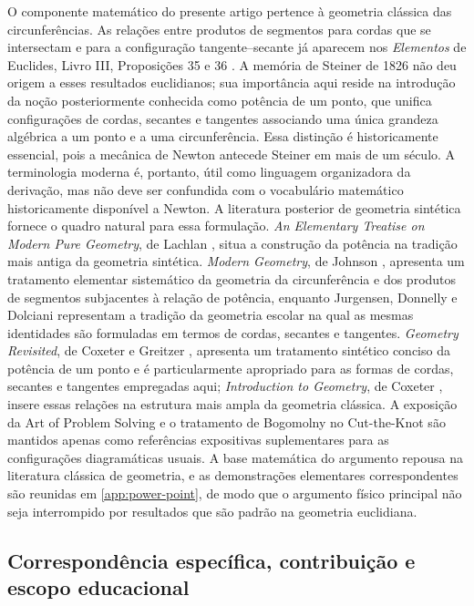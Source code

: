 \documentclass[12pt,a4paper]{article}
\numberwithin{equation}{section}
\theoremstyle{remark}
\begin{document}
O componente matemático do presente artigo pertence à geometria clássica das circunferências. As relações entre produtos de segmentos para cordas que se intersectam e para a configuração tangente--secante já aparecem nos \textit{Elementos} de Euclides, Livro III, Proposições 35 e 36 \cite{euclid1956elements}. A memória de Steiner de 1826 \cite{steiner1826einige} não deu origem a esses resultados euclidianos; sua importância aqui reside na introdução da noção posteriormente conhecida como potência de um ponto, que unifica configurações de cordas, secantes e tangentes associando uma única grandeza algébrica a um ponto e a uma circunferência. Essa distinção é historicamente essencial, pois a mecânica de Newton antecede Steiner em mais de um século. A terminologia moderna é, portanto, útil como linguagem organizadora da derivação, mas não deve ser confundida com o vocabulário matemático historicamente disponível a Newton. A literatura posterior de geometria sintética fornece o quadro natural para essa formulação. \textit{An Elementary Treatise on Modern Pure Geometry}, de Lachlan \cite{lachlan1893elementary}, situa a construção da potência na tradição mais antiga da geometria sintética. \textit{Modern Geometry}, de Johnson \cite{johnson1929modern}, apresenta um tratamento elementar sistemático da geometria da circunferência e dos produtos de segmentos subjacentes à relação de potência, enquanto Jurgensen, Donnelly e Dolciani \cite{jurgensen1963modern} representam a tradição da geometria escolar na qual as mesmas identidades são formuladas em termos de cordas, secantes e tangentes. \textit{Geometry Revisited}, de Coxeter e Greitzer \cite{coxeter1967geometry}, apresenta um tratamento sintético conciso da potência de um ponto e é particularmente apropriado para as formas de cordas, secantes e tangentes empregadas aqui; \textit{Introduction to Geometry}, de Coxeter \cite{coxeter1969introduction}, insere essas relações na estrutura mais ampla da geometria clássica. A exposição da Art of Problem Solving \cite{aopsPowerPoint} e o tratamento de Bogomolny no Cut-the-Knot \cite{bogomolnyPowerPoint} são mantidos apenas como referências expositivas suplementares para as configurações diagramáticas usuais. A base matemática do argumento repousa na literatura clássica de geometria, e as demonstrações elementares correspondentes são reunidas em \ref{app:power-point}, de modo que o argumento físico principal não seja interrompido por resultados que são padrão na geometria euclidiana.

\subsection{Correspondência específica, contribuição e escopo educacional}
\end{document}
